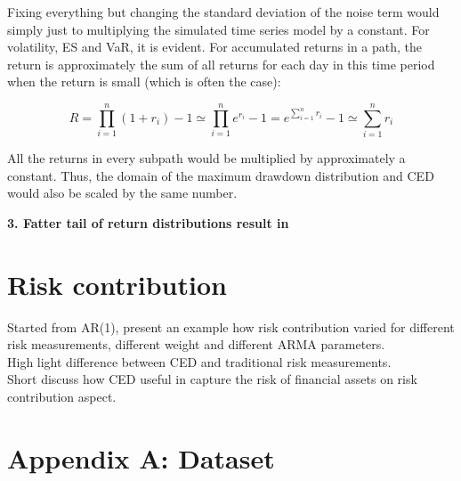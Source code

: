\documentclass[11pt]{article}
\begin{document}
Fixing everything but changing the standard deviation of the noise term would simply just to multiplying the simulated time series model by a constant. For volatility, ES and VaR, it is evident. For accumulated returns in a path, the return is approximately the sum of all returns for each day in this time period when the return is small (which is often the case):

\begin{equation}
R = \prod_{i=1}^n (1+r_i) - 1 \simeq \prod_{i=1}^n e^{r_i} - 1 = e^{\sum_{i=1}^n r_i} - 1 
 \simeq  \sum_{i=1}^n r_i
\end{equation}

All the returns in every subpath would be multiplied by approximately a constant. Thus, the domain of the maximum drawdown distribution and CED would also be scaled by the same number.

\textbf{3. Fatter tail of return distributions result in }

\section{Risk contribution}
Started from AR(1), present an example how risk contribution varied for different risk measurements, different weight and different ARMA parameters.\\

High light difference between CED and traditional risk measurements.\\

Short discuss how CED useful in capture the risk of financial assets on risk contribution aspect.


\clearpage





\clearpage

\newpage
\appendix
\section{Appendix A: Dataset} \label{App:AppendixA}
\end{document}
